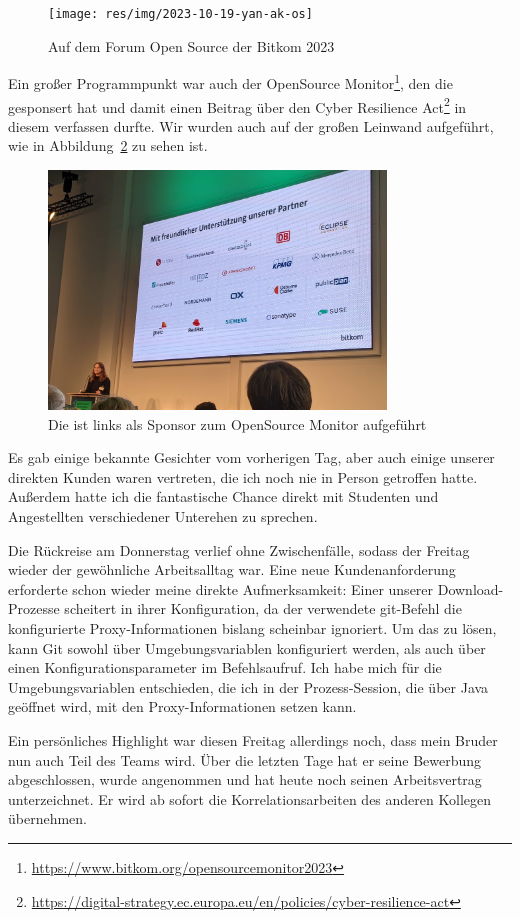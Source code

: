 \begin{figure}[htbp] %
    \centering
    \texttt{[image: res/img/2023-10-19-yan-ak-os]}
    \caption{Auf dem Forum Open Source der Bitkom 2023}
    \label{fig:foss23-yan}
\end{figure}

Ein großer Programmpunkt war auch der {\bitkom} OpenSource Monitor\footnote{\url{https://www.bitkom.org/opensourcemonitor2023}}, den die {\metaeffekt} gesponsert hat und damit einen Beitrag über den Cyber Resilience Act\footnote{\url{https://digital-strategy.ec.europa.eu/en/policies/cyber-resilience-act}} in diesem verfassen durfte.
Wir wurden auch auf der großen Leinwand aufgeführt, wie in Abbildung\ \ref{fig:foss23-sponsor-metaeffekt} zu sehen ist.

\begin{figure}[htbp] %
    \centering
    \includegraphics[width=0.8\textwidth, keepaspectratio]{res/img/2023-10-19-ak-os-metaeffekt-sponsor}
    \caption{Die {\metaeffekt} ist links als Sponsor zum OpenSource Monitor aufgeführt}
    \label{fig:foss23-sponsor-metaeffekt}
\end{figure}

Es gab einige bekannte Gesichter vom vorherigen Tag, aber auch einige unserer direkten Kunden waren vertreten, die ich noch nie in Person getroffen hatte.
Außerdem hatte ich die fantastische Chance direkt mit Studenten und Angestellten verschiedener Unterehen zu sprechen.


Die Rückreise am Donnerstag verlief ohne Zwischenfälle, sodass der Freitag wieder der gewöhnliche Arbeitsalltag war.
Eine neue Kundenanforderung erforderte schon wieder meine direkte Aufmerksamkeit:
Einer unserer Download-Prozesse scheitert in ihrer Konfiguration, da der verwendete git-Befehl die konfigurierte Proxy-Informationen bislang scheinbar ignoriert.
Um das zu lösen, kann Git sowohl über Umgebungsvariablen konfiguriert werden, als auch über einen Konfigurationsparameter im Befehlsaufruf.
Ich habe mich für die Umgebungsvariablen entschieden, die ich in der Prozess-Session, die über Java geöffnet wird, mit den Proxy-Informationen setzen kann.

Ein persönliches Highlight war diesen Freitag allerdings noch, dass mein Bruder nun auch Teil des Teams wird.
Über die letzten Tage hat er seine Bewerbung abgeschlossen, wurde angenommen und hat heute noch seinen Arbeitsvertrag unterzeichnet.
Er wird ab sofort die Korrelationsarbeiten des anderen Kollegen übernehmen.
